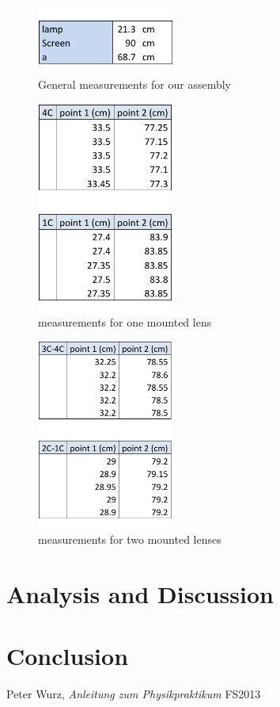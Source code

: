 \documentclass{scrreprt}
\begin{document}
\begin{figure}[H]
	\centering
  \includegraphics[width=0.4\textwidth]{diag/general_measurements.pdf}
	\caption{General measurements for our assembly}
\end{figure}
\begin{figure}[H]
	\centering
  \includegraphics[width=0.4\textwidth]{diag/one_lens.pdf}
	\caption{measurements for one mounted lens}
\end{figure}
\begin{figure}[H]
	\centering
  \includegraphics[width=0.4\textwidth]{diag/two_lenses.pdf}
	\caption{measurements for two mounted lenses}
\end{figure}

\section{Analysis and Discussion}

\section{Conclusion}

\begin{thebibliography}{9}

  Peter Wurz,
  \emph{Anleitung zum Physikpraktikum}
  FS2013

\end{thebibliography}
\end{document}
